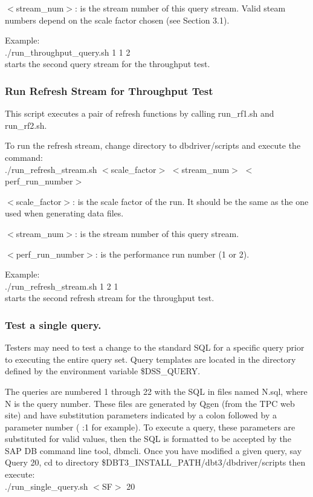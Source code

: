\documentclass{article}
\begin{document}
\noindent
$<$stream\_num$>$: is the stream number of this query stream. Valid steam
numbers depend on the scale factor chosen (see Section 3.1).

\noindent
Example: \\
\indent ./run\_throughput\_query.sh 1 1 2 \\
\indent starts the second query stream for the throughput test. 

\subsubsection{Run Refresh Stream for Throughput Test}

\noindent
This script executes a pair of refresh functions by calling
run\_rf1.sh and run\_rf2.sh.

\noindent
To run the refresh stream, change directory to dbdriver/scripts and
execute the command: \\
\indent ./run\_refresh\_stream.sh  $<$scale\_factor$>$  $<$stream\_num$>$ $<$perf\_run\_number$>$

\noindent
$<$scale\_factor$>$: is the scale factor of the run.  It should be the same
as the one used when generating data files.

\noindent
$<$stream\_num$>$: is the stream number of this query stream.

\noindent
$<$perf\_run\_number$>$: is the performance run number (1 or 2).  

\noindent
Example: \\
\indent ./run\_refresh\_stream.sh 1 2 1 \\
\indent starts the second refresh stream for the throughput test.  

\subsubsection{Test a single query.}

\noindent
Testers may need to test a change to the standard SQL for a specific
query prior to executing the entire query set.  Query templates are
located in the directory defined by the environment variable
\$DSS\_QUERY.

\noindent
The queries are numbered 1 through 22 with the SQL in files named
N.sql, where N is the query number.  These files  are generated by
Qgen (from the TPC web site) and have substitution parameters
indicated by a colon followed by a parameter number ( :1 for
example).  To execute a query, these parameters are substituted for
valid values, then the SQL is formatted to be accepted by the SAP DB
command line tool, dbmcli.  Once you have modified a given query, say
Query 20, cd to directory \$DBT3\_INSTALL\_PATH/dbt3/dbdriver/scripts
then execute: \\
\indent ./run\_single\_query.sh $<$SF$>$  20 
\end{document}
